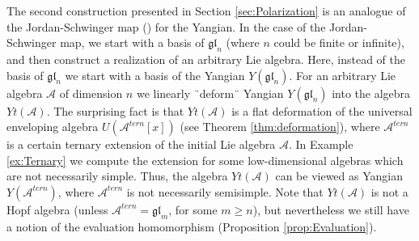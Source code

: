 \documentclass[10pt]{article}%
\numberwithin{equation}{section}
\newcommand{\gl}{{\mathfrak{gl}}}
\begin{document}
The second construction presented in Section \ref{sec:Polarization} is an analogue of the Jordan-Schwinger map (\cite{BFN2021}) for the Yangian. In the case of the Jordan-Schwinger map, we start with a basis of $\gl_n$ (where $n$ could be finite or infinite), and 
 then construct a realization of an arbitrary Lie algebra. Here,  instead of the basis of $\gl_n$ we start with a basis of the Yangian $Y(\gl_n)$.  For an arbitrary Lie algebra $\mathcal{A}$ of dimension $n$ we linearly ¨deform¨ Yangian $Y(\gl_n)$ into the algebra $Yt(\mathcal{A})$. The surprising fact is that $Yt(\mathcal{A})$ is a flat deformation of the universal enveloping algebra $U(\mathcal{A}^{tern}[x])$ (see Theorem \ref{thm:deformation}), where $\mathcal{A}^{tern}$ is a certain ternary extension of the initial Lie algebra $\mathcal{A}$.
In Example \ref{ex:Ternary} we compute the extension for some low-dimensional algebras which are not necessarily simple. Thus, the algebra $Yt(\mathcal{A})$ can be viewed as Yangian $Y(\mathcal{A}^{tern})$, where  $\mathcal{A}^{tern}$ is not necessarily semisimple. Note that $Yt(\mathcal{A})$ is not a Hopf algebra (unless $\mathcal{A}^{tern}=\gl_m$, for some $m\geq n$), but nevertheless we still have a notion of the evaluation homomorphism (Proposition \ref{prop:Evaluation}). 










\end{document}
